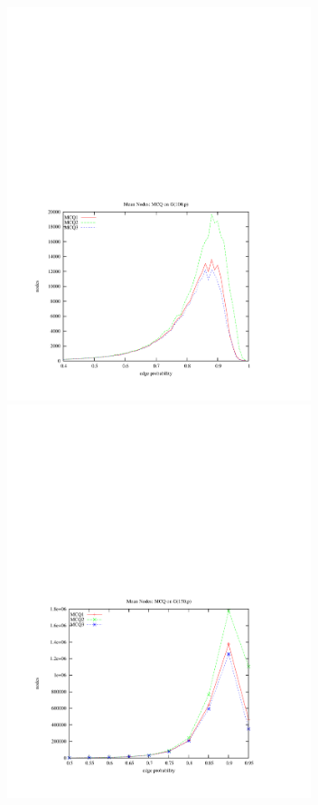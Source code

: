 \documentclass{l4proj}
\begin{document}
\begin{figure}
\vspace{-6cm}
\begin{center}
\hspace{-1.5cm}
\begin{minipage}[t]{0.49\textwidth}
\includegraphics[height=11.5cm]{mcq-style-100.pdf}
\end{minipage}
\hfill
\begin{minipage}[t]{0.49\textwidth}
\includegraphics[height=11.5cm]{mcq-style-150.pdf}

\end{minipage}
\end{center}
\end{figure}
\end{document}
